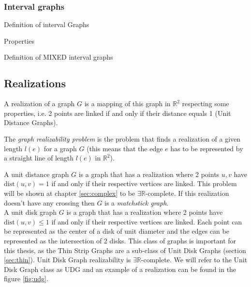 \subsubsection{Interval graphs}

Definition of interval Graphs

Properties

Definition of MIXED interval graphs


\subsection{Realizations}

\begin{defn}
  A realization of a graph $G$ is a mapping of this graph in $\mathbb{R}^2$
  respecting some properties, i.e. 2 points are linked if and only if
  their distance equals 1 (Unit Distance Graphs).
\end{defn}

The \textit{graph realizability problem} is the problem that finds a realization
of a given length $l(e)$ for a graph $G$ (this means that the edge $e$ has to
be represented by a straight line of length $l(e)$ in $\mathbb{R}^2$).

A unit distance graph $G$ is a graph that has a realization where 2 points $u,v$
have $\text{dist}(u,v) = 1$ if and only if their respective vertices are linked.
This problem  will be shown at chapter \ref{sec:complex} to be $\exists
\mathbb{R}$-complete. If  this realization doesn't have any crossing then $G$ is a
\textit{matchstick graph}.\\

A unit disk graph $G$ is a graph that has a realization where 2 points have
$\text{dist}(u,v) \leq 1$ if and only if their respective vertices are linked.
Each point can be represented as the center of a disk of unit diameter and the
edges can be represented as the intersection of 2 disks. This class of graphs
is important for this thesis, as the Thin Strip Graphs are a sub-class of
Unit Disk Graphs (section \ref{sec:thin}). Unit Disk Graph realizability is
$\exists \mathbb{R}$-complete. We will refer to the Unit Disk Graph class as
UDG and an example of a realization can be found in the figure \ref{fig:udg}.

